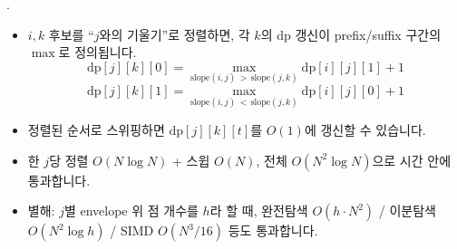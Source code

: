 \begin{frame}{\probno{}. \probtitle{}}
    \begin{itemize}
        \item $i, k$ 후보를 ``$j$와의 기울기''로 정렬하면, 각 $k$의 dp 갱신이 prefix/suffix 구간의 $\max$로 정의됩니다.
        \[
            \mathrm{dp}[j][k][0] = \max_{\mathrm{slope}(i, j) \,>\, \mathrm{slope}(j, k)} \mathrm{dp}[i][j][1] + 1
        \]
        \[
            \mathrm{dp}[j][k][1] = \max_{\mathrm{slope}(i, j) \,<\, \mathrm{slope}(j, k)} \mathrm{dp}[i][j][0] + 1
        \]
        \item 정렬된 순서로 스위핑하면 $\mathrm{dp}[j][k][t]$를 $O(1)$에 갱신할 수 있습니다.
        \item 한 $j$당 정렬 $O(N \log N)$ + 스윕 $O(N)$, 전체 \textbf{$O(N^2 \log N)$}으로 시간 안에 통과합니다.
        \item 별해: $j$별 envelope 위 점 개수를 $h$라 할 때, 완전탐색 $O(h \cdot N^2)$ / 이분탐색 $O(N^2 \log h)$ / SIMD $O(N^3 / 16)$ 등도 통과합니다.
    \end{itemize}
\end{frame}